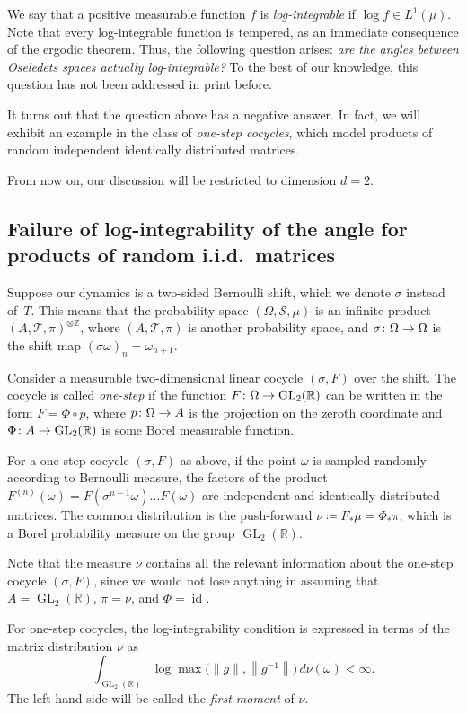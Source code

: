 \documentclass[AHL,Unicode,longabstracts,published]{cedram}
\newcommand{\Z}{\mathbb{Z}}
\newcommand{\R}{\mathbb{R}}
\newcommand{\clS}{\mathcal{S}}
\newcommand{\clT}{\mathcal{T}}
\DeclareMathOperator{\GL}{GL}
\DeclareMathOperator{\idd}{id}
\renewcommand*{\to}{\mathchoice{\longrightarrow}{\rightarrow}{\rightarrow}{\rightarrow}}
\DeclareMathOperator{\GL}{GL}
\newcommand{\R}{\mathbb{R}}
\begin{document}
We say that a positive measurable function $f$ is \emph{log-integrable} if $\log f \in L^1(\mu)$. Note that every log-integrable function is tempered, as an immediate consequence of the ergodic theorem. Thus, the following question arises: \emph{are the angles between Oseledets spaces actually log-integrable?} To the best of our knowledge, this question has not been addressed in print before.

It turns out that the question above has a negative answer. In fact, we will exhibit an example in the class of \emph{one-step cocycles}, which model products of random independent identically distributed matrices.

From now on, our discussion will be restricted to dimension $d=2$.


\subsection{Failure of log-integrability of the angle for products of random i.i.d.~matrices}\label{ss.onestep}

Suppose our dynamics is a two-sided Bernoulli shift, which we denote $\sigma$ instead of~$T$. This means that the probability space $(\Omega,\clS,\mu)$ is an infinite product $(A,\clT,\pi)^{\otimes \Z}$, where $(A,\clT,\pi)$ is another probability space, and $\sigma \colon \Omega \to \Omega$ is the shift map ${(\sigma \omega)_n = \omega_{n+1}}$.

Consider a measurable two-dimensional linear cocycle $(\sigma, F)$ over the shift. The cocycle is called \emph{one-step} if the function $F \colon \Omega \to \GL_2(\R)$ can be written in the form $F = \Phi \circ p$, where $p \colon \Omega \to A$ is the projection on the zeroth coordinate and $\Phi \colon A \to \GL_2(\R)$ is some Borel measurable function.

For a one-step cocycle $(\sigma, F)$ as above, if the point $\omega$ is sampled randomly according to Bernoulli measure, the factors of the product $F^{(n)}(\omega) = F(\sigma^{n-1} \omega) \dots F(\omega)$ are independent and identically distributed matrices. The common distribution is the push-forward $\nu \coloneqq F_* \mu = \Phi_* \pi$, which is a Borel probability measure on the group $\GL_2(\R)$.

Note that the measure $\nu$ contains all the relevant information about the one-step cocycle $(\sigma,F)$, since we would not lose anything in assuming that $A = \GL_2(\R)$, $\pi = \nu$, and $\Phi = \idd$.

For one-step cocycles, the log-integrability condition is expressed in terms of the matrix distribution $\nu$ as
\begin{equation}
\int_{\GL_2(\R)} \log \max \bigl(\|g\|, \left\|g^{-1}\right\| \bigr) \, d\nu(\omega) < \infty.
\end{equation}
The left-hand side will be called the \emph{first moment} of $\nu$.
\end{document}
